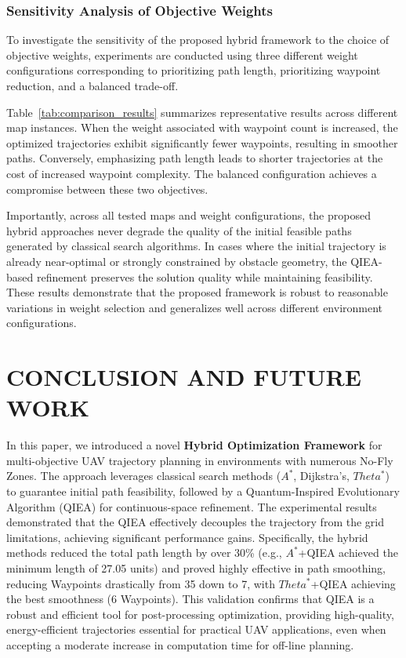 \subsubsection{Sensitivity Analysis of Objective Weights}
To investigate the sensitivity of the proposed hybrid framework to the choice of objective weights, experiments are conducted using three different weight configurations corresponding to prioritizing path length, prioritizing waypoint reduction, and a balanced trade-off.

Table~\ref{tab:comparison_results} summarizes representative results across different map instances. When the weight associated with waypoint count is increased, the optimized trajectories exhibit significantly fewer waypoints, resulting in smoother paths. Conversely, emphasizing path length leads to shorter trajectories at the cost of increased waypoint complexity. The balanced configuration achieves a compromise between these two objectives.

Importantly, across all tested maps and weight configurations, the proposed hybrid approaches never degrade the quality of the initial feasible paths generated by classical search algorithms. In cases where the initial trajectory is already near-optimal or strongly constrained by obstacle geometry, the QIEA-based refinement preserves the solution quality while maintaining feasibility. These results demonstrate that the proposed framework is robust to reasonable variations in weight selection and generalizes well across different environment configurations.




\section{CONCLUSION AND FUTURE WORK}
\label{sec:conclusion}

In this paper, we introduced a novel \textbf{Hybrid Optimization Framework} for multi-objective UAV trajectory planning in environments with numerous No-Fly Zones. The approach leverages classical search methods ($A^{*}$, Dijkstra's, $Theta^{*}$) to guarantee initial path feasibility, followed by a Quantum-Inspired Evolutionary Algorithm (QIEA) for continuous-space refinement. The experimental results demonstrated that the QIEA effectively decouples the trajectory from the grid limitations, achieving significant performance gains. Specifically, the hybrid methods reduced the total path length by over 30\% (e.g., $A^{*}$+QIEA achieved the minimum length of 27.05 units) and proved highly effective in path smoothing, reducing Waypoints drastically from 35 down to 7, with $Theta^{*}$+QIEA achieving the best smoothness (6 Waypoints). This validation confirms that QIEA is a robust and efficient tool for post-processing optimization, providing high-quality, energy-efficient trajectories essential for practical UAV applications, even when accepting a moderate increase in computation time for off-line planning.


